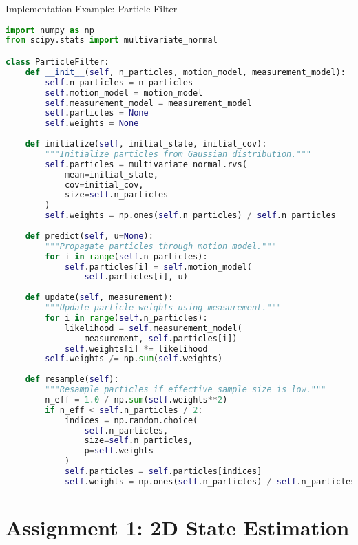 \documentclass[aspectratio=169]{beamer}
\begin{document}
\begin{frame}[fragile]{Implementation Example: Particle Filter}
\begin{lstlisting}[language=Python]
import numpy as np
from scipy.stats import multivariate_normal

class ParticleFilter:
    def __init__(self, n_particles, motion_model, measurement_model):
        self.n_particles = n_particles
        self.motion_model = motion_model
        self.measurement_model = measurement_model
        self.particles = None
        self.weights = None
        
    def initialize(self, initial_state, initial_cov):
        """Initialize particles from Gaussian distribution."""
        self.particles = multivariate_normal.rvs(
            mean=initial_state,
            cov=initial_cov,
            size=self.n_particles
        )
        self.weights = np.ones(self.n_particles) / self.n_particles
        
    def predict(self, u=None):
        """Propagate particles through motion model."""
        for i in range(self.n_particles):
            self.particles[i] = self.motion_model(
                self.particles[i], u)
            
    def update(self, measurement):
        """Update particle weights using measurement."""
        for i in range(self.n_particles):
            likelihood = self.measurement_model(
                measurement, self.particles[i])
            self.weights[i] *= likelihood
        self.weights /= np.sum(self.weights)
        
    def resample(self):
        """Resample particles if effective sample size is low."""
        n_eff = 1.0 / np.sum(self.weights**2)
        if n_eff < self.n_particles / 2:
            indices = np.random.choice(
                self.n_particles,
                size=self.n_particles,
                p=self.weights
            )
            self.particles = self.particles[indices]
            self.weights = np.ones(self.n_particles) / self.n_particles
\end{lstlisting}
\end{frame}

\section{Assignment 1: 2D State Estimation}
\end{document}

